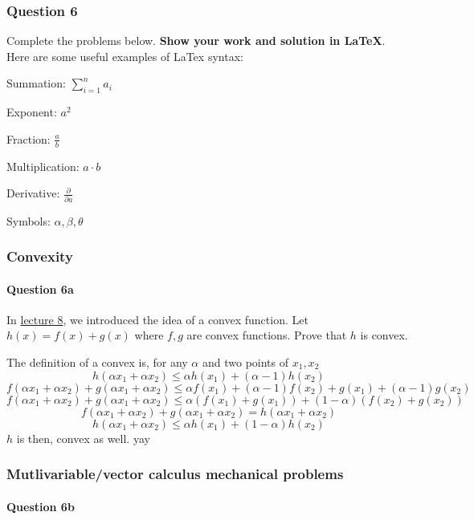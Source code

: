 \documentclass[11pt]{article}
\begin{document}
\subsubsection{Question 6}\label{question-6}

Complete the problems below. \textbf{Show your work and solution in
LaTeX}. Here are some useful examples of LaTex syntax:

Summation: \(\sum_{i=1}^n a_i\)

Exponent: \(a^2\)

Fraction: \(\frac{a}{b}\)

Multiplication: \(a \cdot b\)

Derivative: \(\frac{\partial}{\partial a}\)

Symbols: \(\alpha, \beta, \theta\)

    \subsubsection{Convexity}\label{convexity}

\paragraph{Question 6a}\label{question-6a}

In \href{http://www.ds100.org/fa18/syllabus\#lecture-week-5}{lecture 8},
we introduced the idea of a convex function. Let \(h(x) = f(x) + g(x)\)
where \(f,g\) are convex functions. Prove that \(h\) is convex.

    The definition of a convex is, for any \(\alpha\) and two points of
\(x_1, x_2\)
\[h(\alpha x_1 + \alpha x_2) \leq \alpha h(x_1) + (\alpha - 1)h(x_2)\]
\[f(\alpha x_1 + \alpha x_2) + g(\alpha x_1 + \alpha x_2) \leq \alpha f(x_1) + (\alpha - 1)f(x_2) + g(x_1) + (\alpha - 1)g(x_2)\]
\[f(\alpha x_1 + \alpha x_2) + g(\alpha x_1 + \alpha x_2) \leq \alpha(f(x_1) + g(x_1)) + (1 - \alpha)(f(x_2) + g(x_2))\]
\[f(\alpha x_1 + \alpha x_2) + g(\alpha x_1 + \alpha x_2) = h(\alpha x_1 + \alpha x_2)\]
\[h(\alpha x_1 + \alpha x_2) \leq \alpha h(x_1) + (1 - \alpha) h(x_2)\]
\(h\) is then, convex as well. yay

    \subsubsection{Mutlivariable/vector calculus mechanical
problems}\label{mutlivariablevector-calculus-mechanical-problems}

\paragraph{Question 6b}\label{question-6b}
\end{document}
